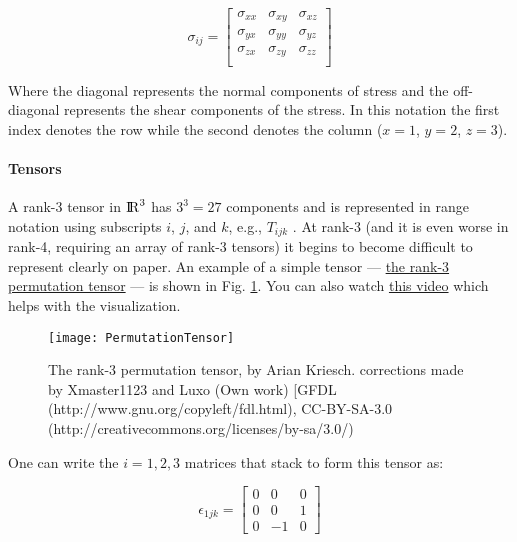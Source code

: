 \begin{equation}
\sigma_{ij} =  
	\begin{bmatrix}
    \sigma_{xx} & \sigma_{xy} & \sigma_{xz}\\
    \sigma_{yx} & \sigma_{yy} & \sigma_{yz}\\
    \sigma_{zx} & \sigma_{zy} & \sigma_{zz}\\
	\end{bmatrix}
\end{equation}

Where the diagonal represents the normal components of stress and the off-diagonal represents the shear components of the stress. In this notation the first index denotes the row while the second denotes the column ($x = 1$, $y = 2$, $z = 3$).

\paragraph{Tensors} A rank-3 tensor in ${\rm I\!R}^3$ has $3^{3} = 27$ components and is represented in range notation using subscripts $i$, $j$, and $k$, e.g., $T_{ijk}$ . At rank-3 (and it is even worse in rank-4, requiring an array of rank-3 tensors) it begins to become difficult to represent clearly on paper. An example of a simple tensor --- \href{https://en.wikipedia.org/wiki/Levi-Civita_symbol#Three_dimensions_2}{the rank-3 permutation tensor} --- is shown in Fig. \ref{fig:PermutationTensor}. You can also watch \href{https://www.youtube.com/watch?v=f5liqUk0ZTw}{this video} which helps with the visualization. 

\begin{figure}%
	\centering
	\texttt{[image: PermutationTensor]}%
	\caption{The rank-3 permutation tensor, by Arian Kriesch. corrections made by Xmaster1123 and Luxo (Own work) [GFDL (http://www.gnu.org/copyleft/fdl.html), CC-BY-SA-3.0 (http://creativecommons.org/licenses/by-sa/3.0/)}%
	\label{fig:PermutationTensor}%
\end{figure}

One can write the $i = 1,2,3$ matrices that stack to form this tensor as: %

\begin{equation}
	\epsilon_{1jk}=
	\begin{bmatrix}
		0 & 0 & 0\\
		0 & 0 & 1\\
		0 & -1 & 0
	\end{bmatrix}
\end{equation}


